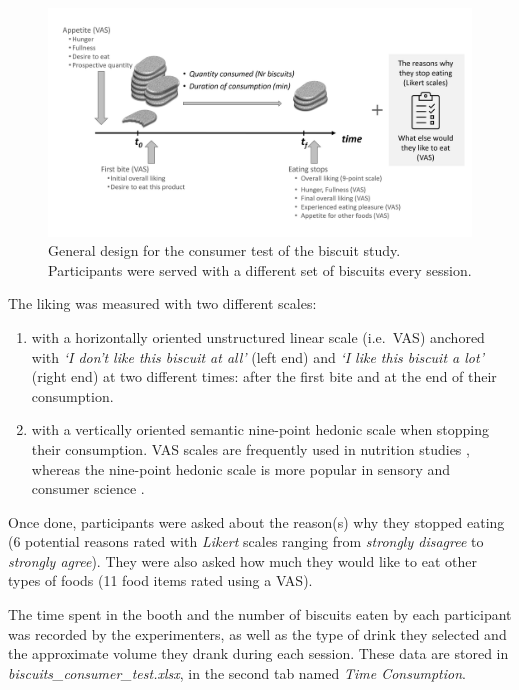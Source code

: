\documentclass[
]{krantz}
\providecommand{\tightlist}{%
  \setlength{\itemsep}{0pt}\setlength{\parskip}{0pt}}
\begin{document}
\begin{figure}

{\centering \includegraphics[width=0.9\linewidth]{images/consumer_test_design} 

}

\caption{General design for the consumer test of the biscuit study. Participants were served with a different set of biscuits every session.}\label{fig:test-design}
\end{figure}

The liking was measured with two different scales:

\begin{enumerate}
\def\labelenumi{\arabic{enumi}.}
\tightlist
\item
  with a horizontally oriented unstructured linear scale (i.e.~VAS) anchored with \emph{`I don't like this biscuit at all'} (left end) and \emph{`I like this biscuit a lot'} (right end) at two different times: after the first bite and at the end of their consumption.
\item
  with a vertically oriented semantic nine-point hedonic scale when stopping their consumption.
  VAS scales are frequently used in nutrition studies \citep{stubbs2000}, whereas the nine-point hedonic scale is more popular in sensory and consumer science \citep{peryam1957, wichchukit2015}.
\end{enumerate}

Once done, participants were asked about the reason(s) why they stopped eating (6 potential reasons rated with \emph{Likert} scales ranging from \emph{strongly disagree} to \emph{strongly agree}). They were also asked how much they would like to eat other types of foods (11 food items rated using a VAS).

The time spent in the booth and the number of biscuits eaten by each participant was recorded by the experimenters, as well as the type of drink they selected and the approximate volume they drank during each session. These data are stored in \emph{biscuits\_consumer\_test.xlsx}, in the second tab named \emph{Time Consumption}.
\end{document}
